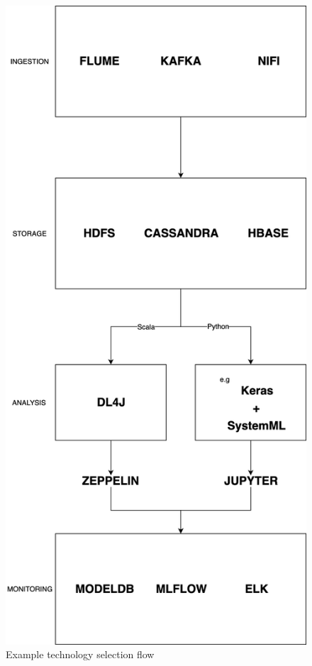 \begin{figure}[ht!]
    \includegraphics[scale=0.33]{images/select_flow} 
    \centering
    \caption{Example technology selection flow}
\end{figure}

